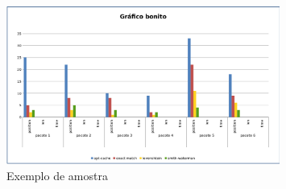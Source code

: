 \begin{figure}[h]
  \centering
	\includegraphics[width=0.8\textwidth]{figuras/grafico}
  \caption{Exemplo de amostra}
  \label{fig:figuras_grafico}
\end{figure}

\lipsum[1]